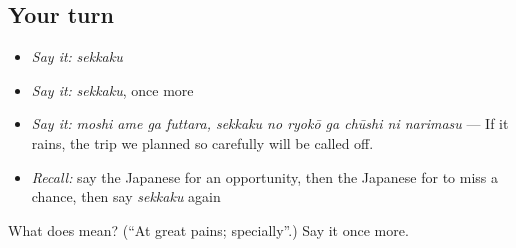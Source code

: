\subsection*{Your turn}
\begin{itemize}
\raggedright
  \item \emph{Say it:} \emph{sekkaku}
  \item \emph{Say it:} \emph{sekkaku}, once more
  \item \emph{Say it:} \emph{moshi ame ga futtara, sekkaku no ryokō ga chūshi ni narimasu} — If it rains, the trip we planned so carefully will be called off.
  \item \emph{Recall:} say the Japanese for an opportunity, then the Japanese for to miss a chance, then say \emph{sekkaku} again
\end{itemize}

\begin{tcolorbox}[breakable,colback=teal!4,colframe=teal!35!black,title={Before you move on}]
What does  mean? (\textquotedblleft{}At great pains; specially\textquotedblright{}.) Say it once more.
\end{tcolorbox}
